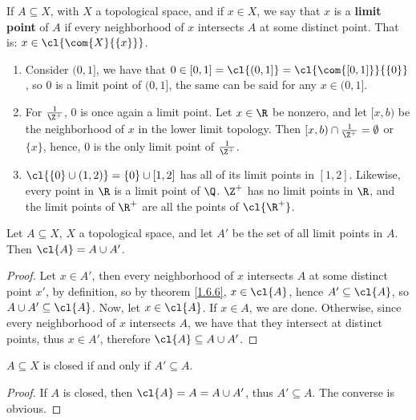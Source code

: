 \begin{definition}
    If $A \subseteq X$, with  $X$ a topological space, and if  $x \in X$, we say
    that  $x$ is a \textbf{limit point} of  $A$ if every neighborhood of  $x$
    intersects $A$ at some distinct point. That is:  $x \in
    \cl{\com{X}{\{x\}}}$.
\end{definition}

\begin{example}
    \begin{enumerate}[label=(\arabic*)]
        \item Consider $(0,1]$, we have that  $0 \in
            [0,1]=\cl{(0,1]}=\cl{\com{[0,1]}}{\{0\}}$, so $0$ is a limit 
            point of $(0,1]$, the same can be said for any  $x \in (0,1]$.		

        \item For $\frac{1}{\Z^+}$, $0$ is once again a limit point. 
            Let  $x \in \R$ be nonzero, and let  $[x,b)$ be the neighborhood
            of  $x$ in the lower limit topology. Then  $[x,b) \cap
            \frac{1}{\Z^+}=\emptyset$ or $\{x\}$, hence,  $0$ is the only limit
            point of  $ \frac{1}{\Z^+}$.

        \item $\cl{\{0\} \cup (1,2)}=\{0\} \cup [1,2]$ has all of its limit
            points in $[1,2]$. Likewise, every point in  $\R$ is a limit point
            of  $\Q$.  $\Z^+$ has no limit points in  $\R$, and the limit points
            of  $\R^+$ are all the points of  $\cl{\R^+}$.
    \end{enumerate}
\end{example} 

\begin{theorem}\label{1.6.7}
    Let $A \subseteq X$,  $X$ a topological space, and let  $A'$ be the set of
    all limit points in  $A$. Then  $\cl{A}=A \cup A'$.
\end{theorem}
\begin{proof}
    Let $x \in A'$, then every neighborhood of  $x$ intersects  $A$ at some
    distinct point  $x'$, by definition, so by theorem \ref{1.6.6},  $x \in
    \cl{A}$, hence $A' \subseteq \cl{A}$, so  $A \cup A' \subseteq \cl{A}$.
    Now, let $x \in \cl{A}$. If  $x \in A$, we are done. Otherwise, since every
    neighborhood of  $x$ intersects  $A$, we have that they intersect at
    distinct points, thus  $x \in A'$, therefore $\cl{A} \subseteq A \cup A' $.
\end{proof}
\begin{corollary}
    $A \subseteq X$ is closed if and only if $A' \subseteq A$.
\end{corollary}
\begin{proof}
    If $A$ is closed, then  $\cl{A}=A=A \cup A'$, thus  $A' \subseteq A$. The
    converse is obvious.		
\end{proof}

